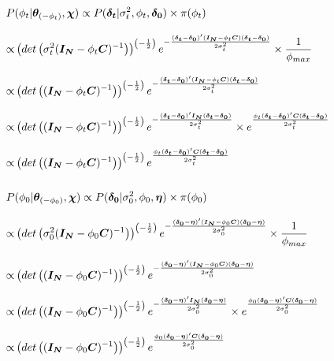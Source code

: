 \documentclass[12pt,a4paper]{article}
\begin{document}
\begin{CJK}{UTF8}{bkai}
\begin{align*}
  P & (\phi_t|\bm{\theta}_{(-\phi_t)},\bm{\chi}) \propto  P(\bm{\delta_{t}}|\sigma_t^2,\phi_t,\bm{\delta_{0}}) \times \pi(\phi_t) \\[3mm]
 \propto &
\left(det\left(\sigma_t^2(\bm{I_N}-\phi_t\bm{C})^{-1}\right)\right)^{\left(-\frac{1}{2}\right)} e^{-\frac{(\bm{\delta_t}-\bm{\delta_{0}})^\prime(\bm{I_N}-\phi_t\bm{C})(\bm{\delta_t}-\bm{\delta_{0}})}{2\sigma_t^2}}\times\frac{1}{\phi_{max}}\\[3mm]
 \propto &
\left(det\left((\bm{I_N}-\phi_t\bm{C})^{-1}\right)\right)^{\left(-\frac{1}{2}\right)} e^{-\frac{(\bm{\delta_t}-\bm{\delta_{0}})^\prime(\bm{I_N}-\phi_t\bm{C})(\bm{\delta_t}-\bm{\delta_{0}})}{2\sigma_t^2}}\\[3mm]
 \propto &
\left(det\left((\bm{I_N}-\phi_t\bm{C})^{-1}\right)\right)^{\left(-\frac{1}{2}\right)} e^{-\frac{(\bm{\delta_t}-\bm{\delta_{0}})^\prime \bm{I_N}(\bm{\delta_t}-\bm{\delta_{0}})}{2\sigma_t^2}} \times e^{\frac{\phi_t (\bm{\delta_t}-\bm{\delta_{0}})^\prime \bm{C}(\bm{\delta_t}-\bm{\delta_{0}})}{2\sigma_t^2}}  \\[3mm]
 \propto &
 \left(det\left((\bm{I_N}-\phi_t\bm{C})^{-1}\right)\right)^{\left(-\frac{1}{2}\right)} e^{\frac{\phi_t (\bm{\delta_t}-\bm{\delta_{0}})^\prime \bm{C}(\bm{\delta_t}-\bm{\delta_{0}})}{2\sigma_t^2}}
\\ \hspace*{\fill} \\
  P & (\phi_0|\bm{\theta}_{(-\phi_0)},\bm{\chi}) \propto  P(\bm{\delta_{0}}|\sigma_0^2,\phi_0,\bm{\eta}) \times \pi(\phi_0) \\[3mm]
 \propto &
\left(det\left(\sigma_0^2(\bm{I_N}-\phi_0\bm{C})^{-1}\right)\right)^{\left(-\frac{1}{2}\right)} e^{-\frac{(\bm{\delta_0}-\bm{\eta})^\prime(\bm{I_N}-\phi_0\bm{C})(\bm{\delta_0}-\bm{\eta})}{2\sigma_0^2}}\times\frac{1}{\phi_{max}}\\[3mm]
 \propto &
\left(det\left((\bm{I_N}-\phi_0\bm{C})^{-1}\right)\right)^{\left(-\frac{1}{2}\right)} e^{-\frac{(\bm{\delta_0}-\bm{\eta})^\prime (\bm{I_N}-\phi_0\bm{C})(\bm{\delta_0}-\bm{\eta})}{2\sigma_0^2}} \\[3mm]
 \propto &
\left(det\left((\bm{I_N}-\phi_0\bm{C})^{-1}\right)\right)^{\left(-\frac{1}{2}\right)} e^{-\frac{(\bm{\delta_0}-\bm{\eta})^\prime \bm{I_N}(\bm{\delta_0}-\bm{\eta})}{2\sigma_0^2}} \times e^{\frac{\phi_0 (\bm{\delta_0}-\bm{\eta})^\prime \bm{C}(\bm{\delta_0}-\bm{\eta})}{2\sigma_0^2}}  \\[3mm]
 \propto &
 \left(det\left((\bm{I_N}-\phi_0\bm{C})^{-1}\right)\right)^{\left(-\frac{1}{2}\right)} e^{\frac{\phi_0 (\bm{\delta_0}-\bm{\eta})^\prime \bm{C}(\bm{\delta_0}-\bm{\eta})}{2\sigma_0^2}}

\end{align*}
\end{CJK}
\end{document}
